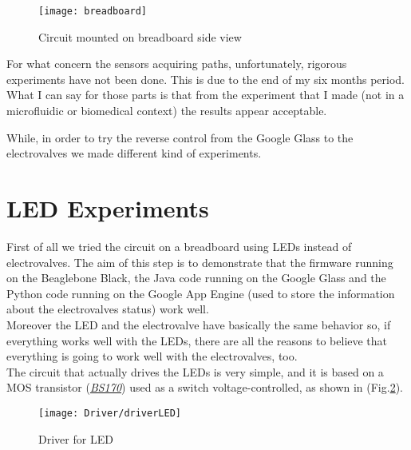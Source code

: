 \begin{figure}[h]
	\begin{center}
		\texttt{[image: breadboard]}
		\caption{Circuit mounted on breadboard side view}
		\label{Fig:circuitsfumatp}
	\end{center}
\end{figure}
For what concern the sensors acquiring paths, unfortunately, rigorous experiments have not been done. This is due to the end of my six months period. What I can say for those parts is that from the experiment that I made (not in a microfluidic or biomedical context) the results appear acceptable.

	While, in order to try the reverse control from the Google Glass to the electrovalves we made different kind of experiments.
	
	\section{LED Experiments}
	 First of all we tried the circuit on a breadboard using LEDs instead of electrovalves. The aim of this step is to demonstrate that the firmware running on the Beaglebone Black, the Java code running on the Google Glass and the Python code running on the Google App Engine (used to store the information about the electrovalves status) work well.\\
	Moreover the LED and the electrovalve have basically the same behavior so, if everything works well with the LEDs, there are all the reasons to believe that everything is going to work well with the electrovalves, too.\\
	
	The circuit that actually drives the LEDs is very simple, and it is based on a MOS transistor (\href{http://www.onsemi.com/pub_link/Collateral/BS170-D.PDF}{\textit{BS170}}) used as a switch voltage-controlled, as shown in (Fig.\ref{Fig:driverLED}).
	
	\begin{figure}[h]
		\centering
		\texttt{[image: Driver/driverLED]}
		\caption{Driver for LED}
		\label{Fig:driverLED}
	\end{figure}
	
